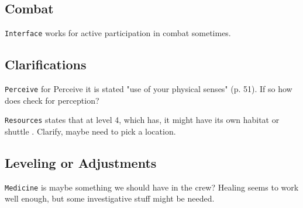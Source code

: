 
\subsection{Combat}

\texttt{Interface} works for active participation in combat sometimes.  \citep[p. 50]{ep2e_1.1_2019}


\subsection{Clarifications}

\texttt{Perceive}  for Perceive it is stated "use of your physical senses" (p. 51). If so how does \egr{} check for perception?

\texttt{Resources} states that at level 4, which \egr{} has, it might have its own habitat or shuttle \citep[p. 75]{ep2e_1.1_2019}. Clarify, maybe need to pick a location.


\subsection{Leveling or Adjustments}

\texttt{Medicine} is maybe something we should have in the crew? Healing seems to work well enough, but some investigative stuff might be needed.